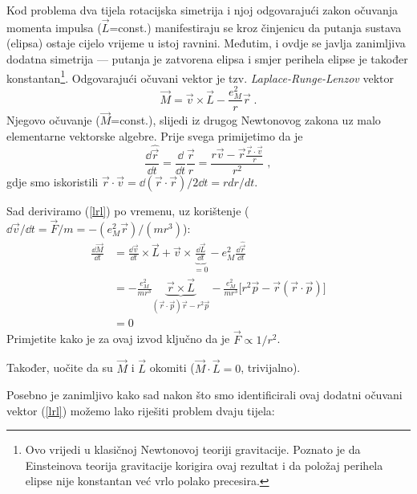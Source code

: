 Kod problema dva tijela rotacijska simetrija i njoj odgovarajući zakon
očuvanja momenta impulsa ($\vec{L}$=const.) manifestiraju se kroz
činjenicu da putanja sustava (elipsa) ostaje cijelo vrijeme u istoj
ravnini.  Međutim, i ovdje se javlja zanimljiva dodatna simetrija ---
putanja je zatvorena elipsa i
smjer perihela elipse je također konstantan\footnote{Ovo
vrijedi u klasičnoj Newtonovoj teoriji gravitacije. Poznato je da
Einsteinova teorija gravitacije korigira ovaj rezultat i da položaj perihela
elipse nije konstantan već vrlo polako precesira.}.
Odgovarajući očuvani vektor je tzv. \emph{Laplace-Runge-Lenzov}
vektor
\begin{equation}
  \vec{M} = \vec{v}\times\vec{L} - \frac{e_{M}^2}{r}\vec{r} \;.
\label{lrl}
\end{equation}
Njegovo očuvanje ($\vec{M}$=const.), slijedi iz drugog Newtonovog
zakona uz malo elementarne vektorske algebre.
Prije svega primijetimo da je
\begin{displaymath}
 \frac{\dd \hat{\vec{r}}}{\dd t} = \frac{\dd}{\dd t} \frac{\vec{r}}{r} =
 \frac{r \vec{v} - \vec{r}
\frac{\vec{r}\cdot\vec{v}}{r}}{r^2} \;,
\end{displaymath}
gdje smo iskoristili $\vec{r}\cdot\vec{v} = \dd (\vec{r}\cdot\vec{r})/2\dd t
= r dr/dt $.

Sad deriviramo (\ref{lrl}) po vremenu, uz korištenje 
($\dd \vec{v}/ \dd t = \vec{F}/m = - (e_{M}^2 \vec{r})/(mr^3)$):
\begin{displaymath}
\begin{split}
\frac{\dd \vec{M}}{\dd t} &=
\frac{\dd \vec{v}}{\dd t} \times \vec{L} + \vec{v}\times
\underbrace{\frac{\dd \vec{L}}{\dd t}}_{=0} - e_{M}^2 \frac{\dd \hat{\vec{r}}}
{\dd t} \\
&= -\frac{e_{M}^2}{mr^3} \underbrace{\vec{r}\times\vec{L}}_{(\vec{r}\cdot 
\vec{p})\vec{r} - r^2 \vec{p}} -
    \frac{e_{M}^2}{mr^3} \Big[ r^2\vec{p} - \vec{r}(\vec{r}\cdot\vec{p})\Big] \\
&= 0
\end{split}
\end{displaymath}
Primjetite kako je za ovaj izvod ključno da je $\vec{F}\propto 1/r^2$.

Također, uočite da su $\vec{M}$ i $\vec{L}$ okomiti
($\vec{M}\cdot\vec{L}=0$, trivijalno).

Posebno je zanimljivo kako sad nakon što smo identificirali ovaj
dodatni očuvani vektor (\ref{lrl}) možemo lako riješiti problem
dvaju tijela:

